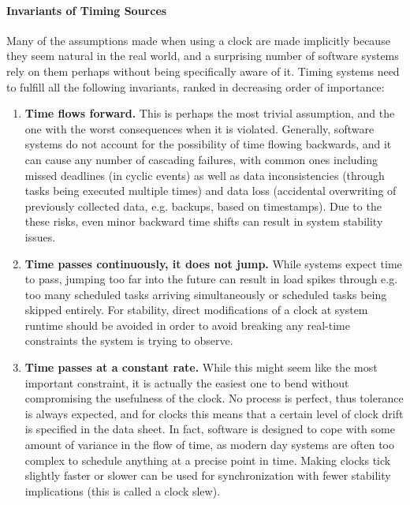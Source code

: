 \paragraph*{Invariants of Timing Sources} Many of the assumptions made when using a clock are made implicitly because they seem natural in the real world, and a surprising number of software systems rely on them perhaps without being specifically aware of it. Timing systems need to fulfill all the following invariants, ranked in decreasing order of importance:

\begin{enumerate}[label=I\arabic*.]
    \item \textbf{Time flows forward.} This is perhaps the most trivial assumption, and the one with the worst consequences when it is violated. Generally, software systems do not account for the possibility of time flowing backwards, and it can cause any number of cascading failures, with common ones including missed deadlines (in cyclic events) as well as data inconsistencies (through tasks being executed multiple times) and data loss (accidental overwriting of previously collected data, e.g. backups, based on timestamps). Due to the these risks, even minor backward time shifts can result in system stability issues.
    \item \textbf{Time passes continuously, it does not jump.} While systems expect time to pass, jumping too far into the future can result in load spikes through e.g. too many scheduled tasks arriving simultaneously or scheduled tasks being skipped entirely. For stability, direct modifications of a clock at system runtime should be avoided in order to avoid breaking any real-time constraints the system is trying to observe.
    \item \textbf{Time passes at a constant rate.} While this might seem like the most important constraint, it is actually the easiest one to bend without compromising the usefulness of the clock. No process is perfect, thus tolerance is always expected, and for clocks this means that a certain level of clock drift is specified in the data sheet. In fact, software is designed to cope with some amount of variance in the flow of time, as modern day systems are often too complex to schedule anything at a precise point in time. Making clocks tick slightly faster or slower can be used for synchronization with fewer stability implications (this is called a clock slew).
    \setcounter{errorConditions}{\value{enumi}}
\end{enumerate}

